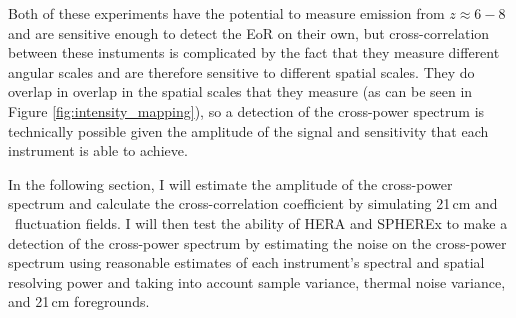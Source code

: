 Both of these experiments have the potential to measure emission from $z \approx 6-8$
and are sensitive enough to detect the EoR on their own, but cross-correlation between
these instuments is complicated by the fact that they measure different angular
scales and are therefore sensitive to different spatial scales. They do overlap
in overlap in the spatial scales that they measure (as can be seen in Figure
\ref{fig:intensity_mapping}), so a detection of the cross-power spectrum is technically possible
given the amplitude of the signal and sensitivity that each instrument is able to achieve.

In the following section, I will estimate the amplitude of the cross-power spectrum and
calculate the cross-correlation coefficient by simulating 21\,cm and \lya\ fluctuation
fields. I will then test the ability of HERA and SPHEREx to make a detection of the
cross-power spectrum by estimating the noise on the cross-power spectrum using
reasonable estimates of each instrument's spectral and spatial resolving power and taking into
account sample variance, thermal noise variance, and 21\,cm foregrounds.
